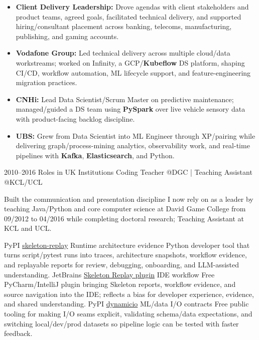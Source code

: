 \documentclass[]{../../../../friggeri-cv}
\begin{document}
\begin{entrylist}
{{        }
        \begin{itemize}[leftmargin=1.1em]
            \item \footnotesize\textbf{Client Delivery Leadership:} Drove agendas with client stakeholders and product teams, agreed goals, facilitated technical delivery, and supported hiring/consultant placement across banking, telecoms, manufacturing, publishing, and gaming accounts.
            \item \footnotesize\textbf{Vodafone Group:} Led technical delivery across multiple cloud/data workstreams; worked on Infinity, a GCP/\textbf{Kubeflow} DS platform, shaping CI/CD, workflow automation, ML lifecycle support, and feature-engineering migration practices.
            \item \footnotesize\textbf{CNHi:} Lead Data Scientist/Scrum Master on predictive maintenance; managed/guided a DS team using \textbf{PySpark} over live vehicle sensory data with product-facing backlog discipline.
            \item \footnotesize\textbf{UBS:} Grew from Data Scientist into ML Engineer through XP/pairing while delivering graph/process-mining analytics, observability work, and real-time pipelines with \textbf{Kafka}, \textbf{Elasticsearch}, and Python.
        \end{itemize}
    }
    \entry
    {2010--2016}
    {Roles in UK Institutions}
    {\small Coding Teacher @DGC | Teaching Assistant @KCL/UCL}
    {
        {\small
        \setlength{\parindent}{0pt}
        \setlength{\leftskip}{0pt}
        Built the communication and presentation discipline I now rely on as a leader by teaching Java/Python and core computer science at David Game College from 09/2012 to 04/2016 while completing doctoral research; Teaching Assistant at KCL and UCL.

        }
    }
\end{entrylist}
\newpage
\setlength{\parskip}{2pt}
\setlength{\parsep}{0pt}
\begin{entrylist2}
    \entrytwo
        {\small PyPI}
        {\small \href{https://pypi.org/project/skeleton-replay/}{skeleton-replay}}
        {\small Runtime architecture evidence}
        {\footnotesize Python developer tool that turns script/pytest runs into traces, architecture snapshots, workflow evidence, and replayable reports for review, debugging, onboarding, and LLM-assisted understanding.}
    \entrytwo
        {\small JetBrains}
        {\small \href{https://plugins.jetbrains.com/plugin/32807-skeleton-replay}{Skeleton Replay plugin}}
        {\small IDE workflow}
        {\footnotesize Free PyCharm/IntelliJ plugin bringing Skeleton reports, workflow evidence, and source navigation into the IDE; reflects a bias for developer experience, evidence, and shared understanding.}
    \entrytwo
        {\small PyPI}
        {\small \href{https://pypi.org/project/dynamicio/}{dynamicio}}
        {\small ML/data I/O contracts}
        {\footnotesize Free public tooling for making I/O seams explicit, validating schema/data expectations, and switching local/dev/prod datasets so pipeline logic can be tested with faster feedback.}
\end{entrylist2}
\end{document}

